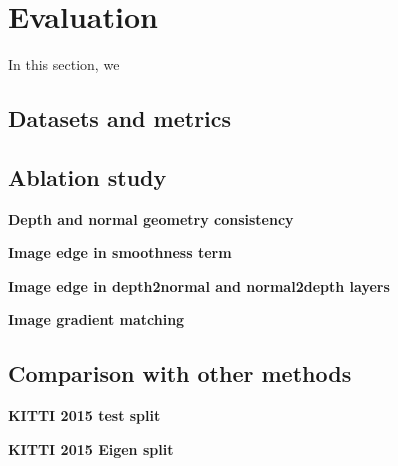 \section{Evaluation}

In this section, we 

\subsection{Datasets and metrics}

\subsection{Ablation study}

\textbf{Depth and normal geometry consistency}

\textbf{Image edge in smoothness term}

\textbf{Image edge in depth2normal and normal2depth layers}

\textbf{Image gradient matching}

\subsection{Comparison with other methods}

\textbf{KITTI 2015 test split}

\textbf{KITTI 2015 Eigen split}